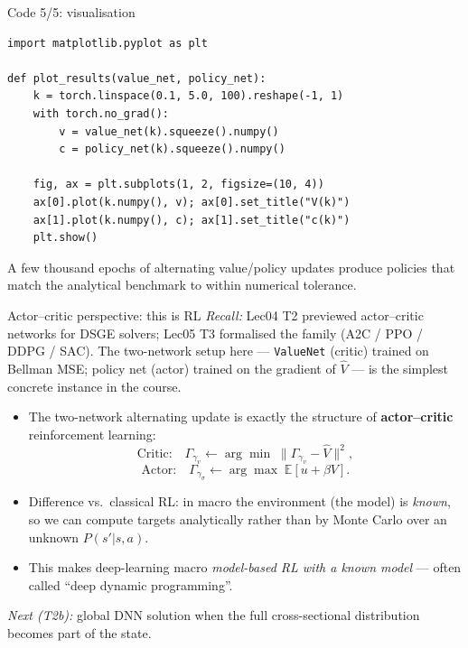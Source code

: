 \begin{frame}[fragile]{Code 5/5: visualisation}
\begin{lstlisting}
import matplotlib.pyplot as plt

def plot_results(value_net, policy_net):
    k = torch.linspace(0.1, 5.0, 100).reshape(-1, 1)
    with torch.no_grad():
        v = value_net(k).squeeze().numpy()
        c = policy_net(k).squeeze().numpy()

    fig, ax = plt.subplots(1, 2, figsize=(10, 4))
    ax[0].plot(k.numpy(), v); ax[0].set_title("V(k)")
    ax[1].plot(k.numpy(), c); ax[1].set_title("c(k)")
    plt.show()
\end{lstlisting}
\medskip
A few thousand epochs of alternating value/policy updates produce policies that match the analytical benchmark to within numerical tolerance.
\end{frame}

\begin{frame}{Actor--critic perspective: this is RL}
\textit{Recall:} Lec04 T2 previewed actor--critic networks for DSGE solvers; Lec05 T3 formalised the family (A2C / PPO / DDPG / SAC). The two-network setup here --- \texttt{ValueNet} (critic) trained on Bellman MSE; policy net (actor) trained on the gradient of $\hat V$ --- is the simplest concrete instance in the course.
\medskip

\begin{itemize}
\item The two-network alternating update is exactly the structure of \textbf{actor--critic} reinforcement learning:
\[
\text{Critic:}\quad \Gamma_{\gamma_v} \leftarrow \arg\min \;\big\|\Gamma_{\gamma_v} - \hat V\big\|^2,
\]
\[
\text{Actor:}\quad \Gamma_{\gamma_\sigma} \leftarrow \arg\max \;\mathbb{E}\!\left[u + \beta V\right].
\]
\medskip
\item Difference vs.\ classical RL: in macro the environment (the model) is \emph{known}, so we can compute targets analytically rather than by Monte Carlo over an unknown $P(s'|s,a)$.
\medskip
\item This makes deep-learning macro \emph{model-based RL with a known model} --- often called ``deep dynamic programming''.
\end{itemize}
\medskip
\emph{Next (T2b):} global DNN solution when the full cross-sectional distribution becomes part of the state.
\end{frame}


